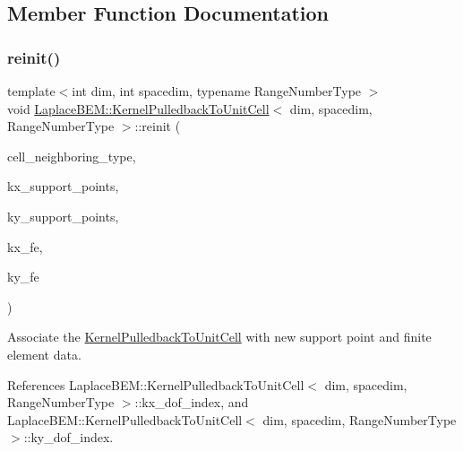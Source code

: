 \subsection{Member Function Documentation}
\mbox{\label{classLaplaceBEM_1_1KernelPulledbackToUnitCell_a6c4063a68f9981ed1f2327670c512f59}} 
\subsubsection{\texorpdfstring{reinit()}{reinit()}}
{\footnotesize\ttfamily template$<$int dim, int spacedim, typename Range\+Number\+Type $>$ \\
void \hyperlink{classLaplaceBEM_1_1KernelPulledbackToUnitCell}{Laplace\+B\+E\+M\+::\+Kernel\+Pulledback\+To\+Unit\+Cell}$<$ dim, spacedim, Range\+Number\+Type $>$\+::reinit (\begin{DoxyParamCaption}\item[{const Cell\+Neighboring\+Type \&}]{cell\+\_\+neighboring\+\_\+type,  }\item[{const std\+::vector$<$ Point$<$ spacedim $>$$>$ \&}]{kx\+\_\+support\+\_\+points,  }\item[{const std\+::vector$<$ Point$<$ spacedim $>$$>$ \&}]{ky\+\_\+support\+\_\+points,  }\item[{const Finite\+Element$<$ dim, spacedim $>$ \&}]{kx\+\_\+fe,  }\item[{const Finite\+Element$<$ dim, spacedim $>$ \&}]{ky\+\_\+fe }\end{DoxyParamCaption})}

Associate the \hyperlink{classLaplaceBEM_1_1KernelPulledbackToUnitCell}{Kernel\+Pulledback\+To\+Unit\+Cell} with new support point and finite element data. 

References Laplace\+B\+E\+M\+::\+Kernel\+Pulledback\+To\+Unit\+Cell$<$ dim, spacedim, Range\+Number\+Type $>$\+::kx\+\_\+dof\+\_\+index, and Laplace\+B\+E\+M\+::\+Kernel\+Pulledback\+To\+Unit\+Cell$<$ dim, spacedim, Range\+Number\+Type $>$\+::ky\+\_\+dof\+\_\+index.

\mbox{\label{classLaplaceBEM_1_1KernelPulledbackToUnitCell_ac55bd556acba999c6d71c322eff33cd9}} 
